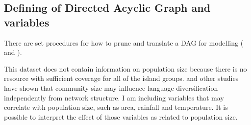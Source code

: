 \documentclass[12pt,letterpaper]{article}
\begin{document}
\newpage
\subsection{Defining of Directed Acyclic Graph and variables}
\label{appendix_DAG_def}

 There are set procedures for how to prune and translate a DAG for modelling (\citet{pearl1995causal} and \citet{mcelreath2020statistical}). 

This dataset does not contain information on population size because there is no resource with sufficient coverage for all of the island groups. \citet{raviv2019larger} and other studies have shown that community size may influence language diversification independently from network structure. I am including variables that may correlate with population size, such as area, rainfall and temperature. It is possible to interpret the effect of those variables as related to population size.



\end{document}
